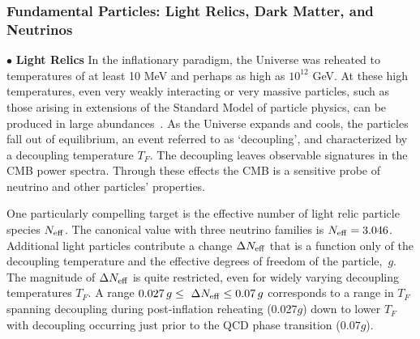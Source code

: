 \documentclass[PICOReport.tex]{subfiles}
\begin{document}
\subsubsection{Fundamental Particles: Light Relics, Dark Matter, and Neutrinos}
\label{sec:relics_neutrinos}

$\bullet$ {\bf Light Relics} \hspace{0.1in} In the inflationary paradigm, the Universe was reheated to temperatures of 
at least 10 MeV and perhaps as 
high as $10^{12}$ GeV.  At these high temperatures, even very weakly interacting or very massive particles, 
such as those arising in extensions of the Standard Model of particle physics, can be produced in large 
abundances~\cite{1979ARNPS..29..313S,Bolz:2000fu}.  As the Universe expands and cools,
the particles fall out of equilibrium, an event referred to as `decoupling', and characterized by a decoupling temperature $T_{F}$.  The decoupling leaves observable signatures in the CMB power spectra. Through these effects the CMB is a sensitive probe of neutrino and other particles' properties.  


One particularly compelling target is the effective number of light relic particle species ${N_{\rm eff}}$. The canonical value with three neutrino families is ${N_{\rm eff}} = 3.046$. Additional light particles contribute a change $\Delta {N_{\rm eff}}$ that is a function only of the decoupling temperature and the effective degrees of freedom of the particle,~$g$. The magnitude of $\Delta{N_{\rm eff}}$ is quite restricted, even for widely varying decoupling temperatures $T_{F}$. A range $ 0.027\,g \leq \ \Delta {N_{\rm eff}} \leq 0.07\,g$ corresponds to a range in $T_{F}$ spanning decoupling during post-inflation reheating (0.027$g$) down to lower $T_{F}$ with decoupling occurring just prior to the QCD phase transition ($0.07g$).
\end{document}
